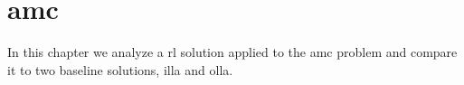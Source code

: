 \glsresetall[\acronymtype]
%
\chapter{\Acl{amc}}
\label{chp:amc}

In this chapter we analyze a \gls{rl} solution applied to the \gls{amc} problem and compare it to two baseline solutions, \gls{illa} and \gls{olla}.
%
%
%
%
%
